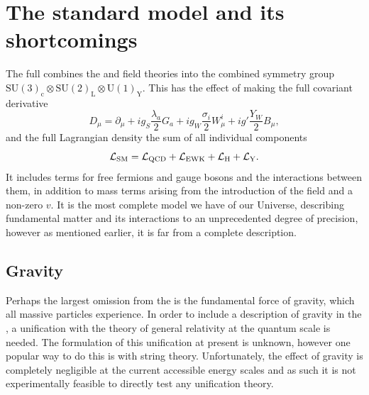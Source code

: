 


\section{The standard model and its shortcomings} %
\label{sec:the_full_standard_model}
The full \SM{} combines the \QCD{} and \EWK{} field theories into the combined symmetry group \ensuremath{\mathrm{SU(3)_{c}}\otimes\mathrm{SU(2)_{L}}\otimes\mathrm{U(1)_{Y}}}.
This has the effect of making the full covariant derivative
\begin{equation}
	D_{\mu} = \partial_{\mu}+ig_{S}\frac{\lambda_{a}}{2}G_{a}+ig_{W}\frac{\sigma_{i}}{2}W_{\mu}^{i}+ig'\frac{Y_{W}}{2}B_{\mu},
\end{equation}
and the full Lagrangian density the sum of all individual components
\begin{equation}
	\mathcal{L}_{\mathrm{SM}} = \mathcal{L}_{\mathrm{QCD}} + \mathcal{L}_{\mathrm{EWK}} + \mathcal{L}_{\mathrm{H}} + \mathcal{L}_{\mathrm{Y}}.
\end{equation}
It includes terms for free fermions and gauge bosons and the interactions between them, in addition to mass terms arising from the introduction of the \BEH{} field and a non-zero $v$.
It is the most complete model we have of our Universe, describing fundamental matter and its interactions to an unprecedented degree of precision, however as mentioned earlier, it is far from a complete description.

\subsection{Gravity} %
\label{sub:gravity}

Perhaps the largest omission from the \SM{} is the fundamental force of gravity, which all massive particles experience.
In order to include a description of gravity in the \SM{}, a unification with the theory of general relativity at the quantum scale is needed.
The formulation of this unification at present is unknown, however one popular way to do this is with string theory.
Unfortunately, the effect of gravity is completely negligible at the current accessible energy scales and as such it is not experimentally feasible to directly test any unification theory.  

